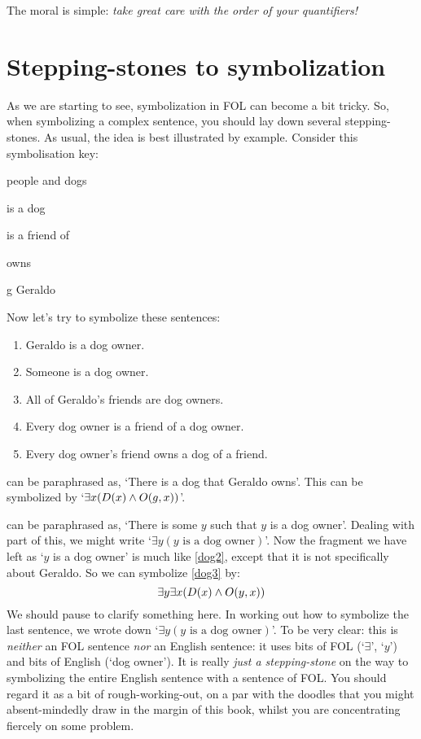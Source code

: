 The moral is simple: \emph{take great care with the order of your quantifiers!}


\section{Stepping-stones to symbolization}
As we are starting to see, symbolization in FOL can become a bit tricky. So, when symbolizing a complex sentence, you should lay down several stepping-stones. As usual, the idea is best illustrated by example. Consider this symbolisation key: 
\begin{ekey}
\item[\text{domain}] people and dogs
\item[\atom{D}{x}]  is a dog
\item[\atom{F}{x,y}]  is a friend of 
\item[\atom{O}{x,y}]  owns 
\item[g] Geraldo
\end{ekey}
Now let's try to symbolize these sentences:
\begin{enumerate}
\item\label{dog2} Geraldo is a dog owner.
\item\label{dog3} Someone is a dog owner.
\item\label{dog4} All of Geraldo's friends are dog owners.
\item\label{dog5} Every dog owner is a friend of a dog owner.
\item\label{dog6} Every dog owner's friend owns a dog of a friend.
\end{enumerate}
 can be paraphrased as, `There is a dog that Geraldo owns'. This can be symbolized by `$\exists x(D(x) \wedge O(g,x))$'.

 can be paraphrased as, `There is some $y$ such that $y$ is a dog owner'. Dealing with part of this, we might write `$\exists y(y\text{ is a dog owner})$'. Now the fragment we have left as `$y$ is a dog owner' is much like \cref*{dog2}, except that it is not specifically about Geraldo. So we can symbolize \cref*{dog3} by:
$$\exists y \exists x(D(x) \wedge O(y,x))$$
We should pause to clarify something here. In working out how to
symbolize the last sentence, we wrote down `$\exists y(y\text{ is a
dog owner})$'. To be very clear: this is \emph{neither} an FOL
sentence \emph{nor} an English sentence: it uses bits of FOL
(`$\exists$', `$y$') and bits of English (`dog owner'). It is really
\emph{just a stepping-stone} on the way to symbolizing the entire
English sentence with a sentence of FOL. You should regard it as a bit of
rough-working-out, on a par with the doodles that you might
absent-mindedly draw in the margin of this book, whilst you are
concentrating fiercely on some problem.  

